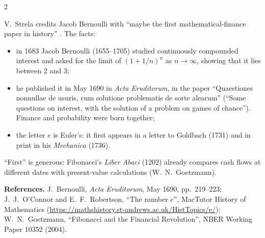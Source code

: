 \begin{paracol}{2}
\begin{history}
V.~Strela credits Jacob Bernoulli with ``maybe the first mathematical-finance paper in history''
. The facts:
\begin{itemize}
  \item in 1683 Jacob Bernoulli (1655--1705) studied continuously compounded interest and asked for
        the limit of $(1+1/n)^n$ as $n\to\infty$, showing that it lies between 2 and 3;
  \item he published it in May 1690 in \emph{Acta Eruditorum}, in the paper ``Quaestiones nonnullae
        de usuris, cum solutione problematis de sorte alearum'' (``Some questions on interest,
        with the solution of a problem on games of chance''). Finance and probability were
        born together;
  \item the letter $e$ is Euler's: it first appears in a letter to Goldbach (1731) and in print in
        his \emph{Mechanica} (1736).
\end{itemize}
``First'' is generous: Fibonacci's \emph{Liber Abaci} (1202) already compares cash flows at
different dates with present-value calculations (W.~N.~Goetzmann).

\smallskip
{\footnotesize\textbf{References.} J.~Bernoulli, \emph{Acta Eruditorum}, May 1690, pp.~219--223;
J.~J.~O'Connor and E.~F.~Robertson, ``The number $e$'', MacTutor History of Mathematics
(\url{https://mathshistory.st-andrews.ac.uk/HistTopics/e/});
W.~N.~Goetzmann, ``Fibonacci and the Financial Revolution'', NBER Working Paper 10352 (2004).}
\end{history}


\end{paracol}
